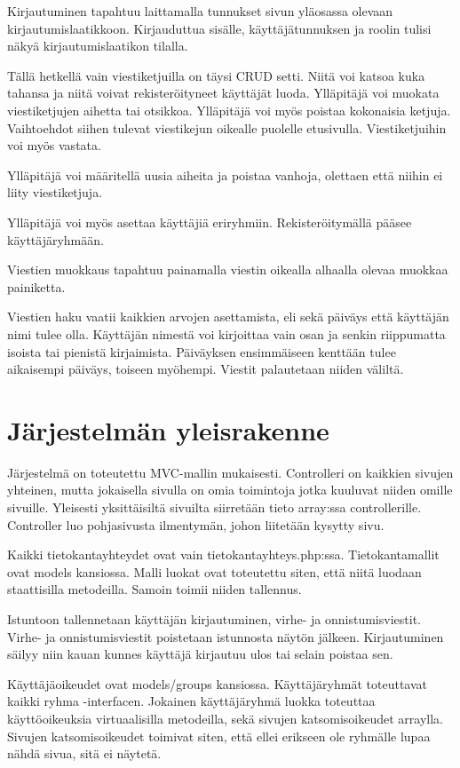 \documentclass[a4paper, 12pt, finnish]{article}
\begin{document}
Kirjautuminen tapahtuu laittamalla tunnukset sivun yläosassa olevaan kirjautumislaatikkoon.
Kirjauduttua sisälle, käyttäjätunnuksen ja roolin tulisi näkyä kirjautumislaatikon tilalla.
\indent

Tällä hetkellä vain viestiketjuilla on täysi CRUD setti.
Niitä voi katsoa kuka tahansa ja niitä voivat rekisteröityneet käyttäjät luoda.
Ylläpitäjä voi muokata viestiketjujen aihetta tai otsikkoa.
Ylläpitäjä voi myös poistaa kokonaisia ketjuja.
Vaihtoehdot siihen tulevat viestikejun oikealle puolelle etusivulla.
Viestiketjuihin voi myös vastata.
\indent

Ylläpitäjä voi määritellä uusia aiheita ja poistaa vanhoja, olettaen että niihin ei liity viestiketjuja.
\indent

Ylläpitäjä voi myös asettaa käyttäjiä eriryhmiin.
Rekisteröitymällä pääsee käyttäjäryhmään.
\indent

Viestien muokkaus tapahtuu painamalla viestin oikealla alhaalla olevaa muokkaa painiketta.
\indent

Viestien haku vaatii kaikkien arvojen asettamista, eli sekä päiväys että käyttäjän nimi tulee olla.
Käyttäjän nimestä voi kirjoittaa vain osan ja senkin riippumatta isoista tai pienistä kirjaimista.
Päiväyksen ensimmäiseen kenttään tulee aikaisempi päiväys, toiseen myöhempi.
Viestit palautetaan niiden väliltä.

\newpage

\section{Järjestelmän yleisrakenne}
Järjestelmä on toteutettu MVC-mallin mukaisesti.
Controlleri on kaikkien sivujen yhteinen, mutta jokaisella sivulla on omia toimintoja jotka kuuluvat niiden omille sivuille.
Yleisesti yksittäisiltä sivuilta siirretään tieto array:ssa controllerille.
Controller luo pohjasivusta ilmentymän, johon liitetään kysytty sivu.
\indent

Kaikki tietokantayhteydet ovat vain tietokantayhteys.php:ssa.
Tietokantamallit ovat models kansiossa.
Malli luokat ovat toteutettu siten, että niitä luodaan staattisilla metodeilla.
Samoin toimii niiden tallennus.
\indent

Istuntoon tallennetaan käyttäjän kirjautuminen, virhe- ja onnistumisviestit.
Virhe- ja onnistumisviestit poistetaan istunnosta näytön jälkeen.
Kirjautuminen säilyy niin kauan kunnes käyttäjä kirjautuu ulos tai selain poistaa sen.
\indent

Käyttäjäoikeudet ovat models/groups kansiossa.
Käyttäjäryhmät toteuttavat kaikki ryhma -interfacen.
Jokainen käyttäjäryhmä luokka toteuttaa käyttöoikeuksia virtuaalisilla metodeilla, sekä sivujen katsomisoikeudet arraylla.
Sivujen katsomisoikeudet toimivat siten, että ellei erikseen ole ryhmälle lupaa nähdä sivua, sitä ei näytetä.
\end{document}

